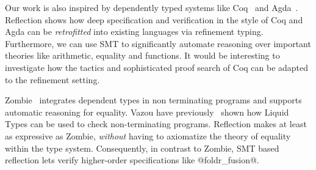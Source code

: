 

%
Our work is also inspired by dependently typed
systems like Coq~\citep{coq-book} and
Agda~\citep{agda}.
%
Reflection shows how deep specification
and verification in the style of Coq and Agda
can be \emph{retrofitted} into existing languages
via refinement typing.
%
Furthermore, we can use SMT to significantly
automate reasoning over important theories like
arithmetic, equality and functions.
%
It would be interesting to investigate how
the tactics and sophisticated proof search
of Coq \etc can be adapted to the refinement setting.

%


%
Zombie~\citep{Zombie, Sjoberg2015} integrates
dependent types in non terminating programs
and supports automatic reasoning for equality.
%
Vazou \etal have previously~\citep{Vazou14} shown
how Liquid Types can be used to check
non-terminating programs.
%
Reflection makes \toolname at least as
expressive as Zombie, \emph{without}
having to axiomatize the theory of
equality within the type system.
%
Consequently, in contrast to Zombie,
SMT based reflection lets \toolname
verify higher-order specifications
like @foldr_fusion@.

%
%
%

